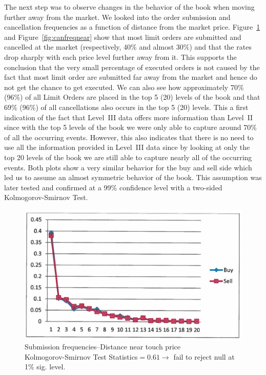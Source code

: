 The next step was to observe changes in the behavior of the book when moving further away from the market. We looked into the order submission and cancellation frequencies as a function of distance from the market price. Figure~\ref{fig:subfreqnear} and Figure~\ref{fig:canfreqnear} show that most limit orders are submitted and cancelled at the market (respectively, 40\% and almost 30\%) and that the rates drop sharply with each price level further away from it. This supports the conclusion that the very small percentage of executed orders is not caused by the fact that most limit order are submitted far away from the market and hence do not get the chance to get executed. We can also see how approximately 70\% (96\%) of all Limit Orders are placed in the top 5 (20) levels of the book and that 69\% (96\%) of all cancellations also occurs in the top 5 (20) levels. This a first indication of the fact that Level~III data offers more information than Level~II since with the top 5 levels of the book we were only able to capture around 70\% of all the occurring events. However, this also indicates that there is no need to use all the information provided in Level~III data since by looking at only the top 20 levels of the book we are still able to capture nearly all of the occurring events. Both plots show a very similar behavior for the buy and sell side which led us to assume an almost symmetric behavior of the book. This assumption was later tested and confirmed at a 99\% confidence level with a two-sided Kolmogorov-Smirnov Test. 
	\begin{figure}[!ht]
   	\centering
   	\includegraphics[width=\textwidth]{chapters/chapter_trade_data_models/figures/subfreqnear.png} 
   	\caption{Submission frequencies--Distance near touch price \\ Kolmogorov-Smirnov Test Statistics$=0.61 \to$ fail to reject null at 1\% sig. level. \label{fig:subfreqnear}}
	\end{figure}
